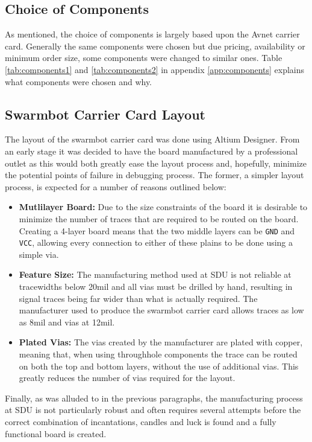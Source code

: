 \subsection{Choice of Components}
As mentioned, the choice of components is largely based upon the Avnet carrier card.
Generally the same components were chosen but due pricing, availability or minimum order size, some components were changed to similar ones.
Table \ref{tab:components1} and \ref{tab:components2} in appendix \ref{app:components} explains what components were chosen and why.

\subsection{Swarmbot Carrier Card Layout} %
\label{sub:swarmbot_carrier_card_layout}
The layout of the swarmbot carrier card was done using Altium Designer.
From an early stage it was decided to have the board manufactured by a professional outlet as this would both greatly ease the layout process and, hopefully, minimize the potential points of failure in debugging process.
The former, a simpler layout process, is expected for a number of reasons outlined below:
\begin{itemize}
  	\item \textbf{Mutlilayer Board:} Due to the size constraints of the board it is desirable to minimize the number of traces that are required to be routed on the board.
  	Creating a 4-layer board means that the two middle layers can be \texttt{GND} and \texttt{VCC}, allowing every connection to either of these plains to be done using a simple via.
  	\item \textbf{Feature Size:} The manufacturing method used at SDU is not reliable at tracewidths below 20mil and all vias must be drilled by hand, resulting in signal traces being far wider than what is actually required.
  	The manufacturer used to produce the swarmbot carrier card \cite{itead} allows traces as low as 8mil and vias at 12mil.
  	\item \textbf{Plated Vias:} The vias created by the manufacturer are plated with copper, meaning that, when using throughhole components the trace can be routed on both the top and bottom layers, without the use of additional vias.
  	This greatly reduces the number of vias required for the layout.
  \end{itemize}
Finally, as was alluded to in the previous paragraphs, the manufacturing process at SDU is not particularly robust and often requires several attempts before the correct combination of incantations, candles and luck is found and a fully functional board is created.
